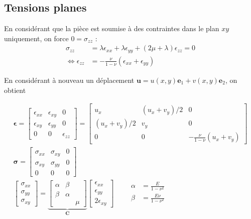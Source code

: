 \documentclass[12pt]{article}
\newcommand{\uu}{\mathbf{u}}
\newcommand{\stress}{\boldsymbol{\sigma}}
\newcommand{\strain}{\boldsymbol{\epsilon}}
\begin{document}
\subsection{Tensions planes}
En considérant que la pièce est soumise à des contraintes dans le plan
$xy$ uniquement, on force $0=\sigma_{zz}$ :
\begin{equation}
    \begin{aligned}
        \sigma_{zz} &= \lambda \epsilon_{xx}+ \lambda\epsilon_{yy}
        + (2\mu+\lambda) \epsilon_{zz} = 0\\
        \iff \epsilon_{zz} &= -\frac{\nu}{1-\nu} (\epsilon_{xx} + \epsilon_{yy})
    \end{aligned}
\end{equation}

En considérant à nouveau un déplacement $\uu = u(x,y)\mathbf{e}_1 
+ v(x,y)\mathbf{e}_2$, on obtient

\begin{gather}
    \strain =
    \begin{bmatrix}
        \epsilon_{xx} & \epsilon_{xy} & 0\\
        \epsilon_{xy} & \epsilon_{yy} & 0\\
        0 & 0 & \epsilon_{zz}
    \end{bmatrix}
    =
    \begin{bmatrix}
        u_x & (u_x+v_y)/2 & 0\\
        (u_x+v_y)/2 & v_y & 0\\
        0 & 0 & -\frac{\nu}{1-\nu} (u_x + v_y)
    \end{bmatrix}\label{eq:planeStressStrain}
    \\[1em]
    \stress =
    \begin{bmatrix}
        \sigma_{xx} & \sigma_{xy} & 0\\
        \sigma_{xy} & \sigma_{yy} & 0\\
        0 & 0 & 0
    \end{bmatrix}\\[1em]
    \begin{bmatrix}
        \sigma_{xx}\\
        \sigma_{yy}\\
        \sigma_{xy}
    \end{bmatrix} = 
    \underbrace{
    \begin{bmatrix}
        \alpha & \beta & \\
        \beta & \alpha & \\
         &  & \mu
    \end{bmatrix}}_{\mathbf{C}}
    \begin{bmatrix}
        \epsilon_{xx}\\
        \epsilon_{yy}\\
        2\epsilon_{xy}
    \end{bmatrix} \qquad 
    \begin{aligned}
        \alpha &= \frac{E}{1 - \nu^2}\\
        \beta &= \frac{E\nu}{1 - \nu^2}\\
    \end{aligned}
\end{gather}
\end{document}
